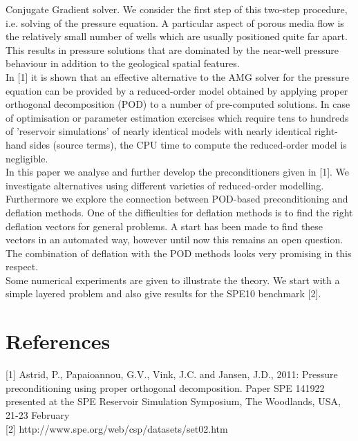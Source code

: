 \documentclass{report}
\begin{document}
Conjugate Gradient solver.
We consider the first step of this two-step procedure, i.e. solving of
the pressure equation. A particular aspect of porous media flow is the
relatively small number of wells which are usually positioned quite far
apart. This results in pressure solutions that are dominated by the
near-well pressure behaviour in addition to the geological spatial
features.
\\[2ex]
In [1] it is shown that an effective alternative to the AMG solver for
the pressure equation can be provided by a
reduced-order model obtained by applying proper orthogonal decomposition
(POD) to a number of pre-computed solutions.
In case of optimisation or
parameter estimation exercises which require tens to hundreds of
'reservoir simulations' of nearly identical models with nearly identical
right-hand sides (source terms), the CPU time to compute the
reduced-order model is negligible.
\\[2ex]
In this paper we analyse and further develop
the preconditioners given in [1]. We investigate alternatives using
different varieties of reduced-order modelling. Furthermore we explore
the connection between POD-based preconditioning and deflation methods.
One of the difficulties for deflation methods is to find the right
deflation vectors for general problems. A start has been made to find
these vectors in an automated way, however until now this remains an
open question. The combination of deflation with the POD methods looks
very promising in this respect.
\\[2ex]
Some numerical experiments are given to illustrate the theory. We start
with a simple layered problem and also give results for the SPE10
benchmark [2].
\section*{References}
[1]
Astrid, P., Papaioannou, G.V., Vink, J.C. and Jansen, J.D., 2011:
Pressure preconditioning using proper orthogonal decomposition. Paper
SPE 141922 presented at the SPE Reservoir Simulation Symposium, The
Woodlands, USA, 21-23 February
\\[2ex]
[2] http://www.spe.org/web/csp/datasets/set02.htm
\end{document}
